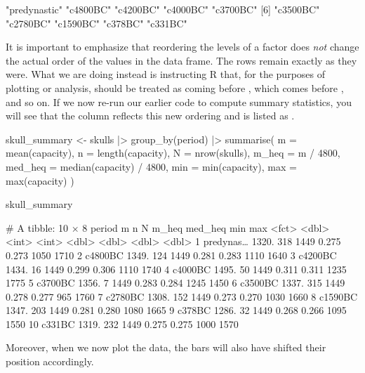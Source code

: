 
\begin{outR}
 [1] "predynastic" "c4800BC"     "c4200BC"     "c4000BC"     "c3700BC"    
 [6] "c3500BC"     "c2780BC"     "c1590BC"     "c378BC"      "c331BC" 
\end{outR}

It is important to emphasize that reordering the levels of a factor does \textit{not} change the actual order of the values in the data frame. The rows remain exactly as they were. What we are doing instead is instructing R that, for the purposes of plotting or analysis,  should be treated as coming before , which comes before , and so on. If we now re-run our earlier code to compute summary statistics, you will see that the  column reflects this new ordering and is listed as .

\begin{inR}
skull_summary <- skulls |>
  group_by(period) |>
  summarise(
    m = mean(capacity),
    n = length(capacity),
    N = nrow(skulls),
    m_heq = m / 4800,
    med_heq = median(capacity) / 4800,
    min = min(capacity),
    max = max(capacity)
  )

skull_summary
\end{inR}

\begin{outR}
# A tibble: 10 × 8
   period        m     n     N m_heq med_heq   min   max
   <fct>     <dbl> <int> <int> <dbl>   <dbl> <dbl> <dbl>
 1 predynas… 1320.   318  1449 0.275   0.273  1050  1710
 2 c4800BC   1349.   124  1449 0.281   0.283  1110  1640
 3 c4200BC   1434.    16  1449 0.299   0.306  1110  1740
 4 c4000BC   1495.    50  1449 0.311   0.311  1235  1775
 5 c3700BC   1356.     7  1449 0.283   0.284  1245  1450
 6 c3500BC   1337.   315  1449 0.278   0.277   965  1760
 7 c2780BC   1308.   152  1449 0.273   0.270  1030  1660
 8 c1590BC   1347.   203  1449 0.281   0.280  1080  1665
 9 c378BC    1286.    32  1449 0.268   0.266  1095  1550
10 c331BC    1319.   232  1449 0.275   0.275  1000  1570
\end{outR}

\noindent
Moreover, when we now plot the data, the bars will also have shifted their position accordingly.

